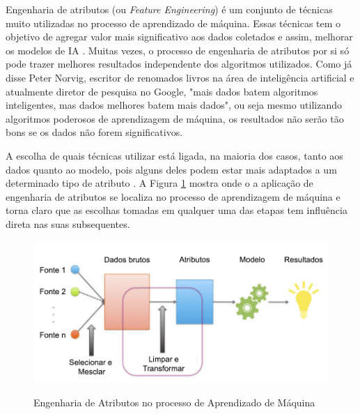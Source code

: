 \documentclass[oneside,openright,12pt]{ufsm_2015} %
\begin{document}
    \par Engenharia de atributos (ou \textit{Feature Engineering}) é um conjunto de técnicas muito utilizadas no processo de aprendizado de máquina. Essas técnicas tem o objetivo de agregar valor mais significativo aos dados coletados e assim, melhorar os modelos de IA \cite{book:zheng:2018}. Muitas vezes, o processo de engenharia de atributos por si só pode trazer melhores resultados independente dos algoritmos utilizados. Como já disse Peter Norvig, escritor de renomados livros na área de inteligência artificial e atualmente diretor de pesquisa no Google, "mais dados batem algoritmos inteligentes, mas dados melhores batem mais dados", ou seja mesmo utilizando algoritmos poderosos de aprendizagem de máquina, os resultados não serão tão bons se os dados não forem significativos.
    
    \par A escolha de quais técnicas utilizar está ligada, na maioria dos casos, tanto aos dados quanto ao modelo, pois alguns deles podem estar mais adaptados a um determinado tipo de atributo \cite{book:zheng:2018}. A Figura \ref{fig:feature-engineering} mostra onde o a aplicação de engenharia de atributos se localiza no processo de aprendizagem de máquina e torna claro que as escolhas tomadas em qualquer uma das etapas tem influência direta nas suas subsequentes.
    
    \begin{figure}[ht]
        \caption{Engenharia de Atributos no processo de Aprendizado de Máquina}
        \centering
        \includegraphics[width=1\textwidth]{figuras/feature-engineering.png}
        \vspace{\baselineskip} %
        \label{fig:feature-engineering}
    \end{figure}
    
\end{document}
